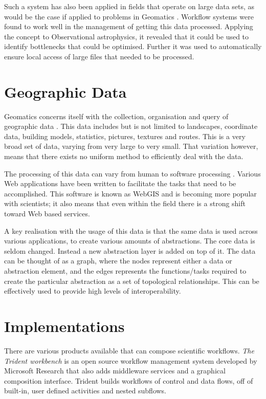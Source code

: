 \documentclass[12pt,a4paper]{report}
\begin{document}
Such a system has also been applied in fields that operate on large data
sets, as would be the case if applied to problems in Geomatics
\cite{Aragon:2009:WMH:1529282.1529491}.  Workflow systems were found to
work well in the management of getting this data processed. Applying the
concept to Observational astrophysics, it revealed that it could be used to
identify bottlenecks that could be optimised.  Further it was used to
automatically ensure local access of large files that needed to be processed.


\section{Geographic Data}
Geomatics concerns itself with the collection, organisation and query of
geographic data \cite{DiMartino:2007:TAG:1341012.1341081}.  This data includes
but  is not limited to landscapes, coordinate data, building models,
statistics, pictures, textures and routes. This is a very broad set of data,
varying from very large to very small.  That variation however, means that
there exists no uniform method to efficiently deal with the data.

The processing of this data can vary from human to software processing
\cite{DiMartino:2007:TAG:1341012.1341081}.  Various Web applications have been
written to facilitate the tasks that need to be accomplished.  This software is
known as WebGIS and is becoming more popular with scientists; it also means
that even within the field there is a strong shift toward Web based services.

A key realisation with the usage of this data is that the same data is used
across various applications, to create various amounts of
abstractions\cite{ElAdnani:2001:MLF:512161.512177}.  The core data is seldom
changed. Instead a new abstraction layer is added on top of it. The data can be
thought of as a graph, where the nodes represent either a data or abstraction
element, and the edges represents the functions/tasks required to create the
particular abstraction as a set of topological relationships. This can be
effectively used to provide high levels of interoperability.

\section{Implementations}
There are various products available that can compose scientific workflows.
\emph{The Trident workbench} \cite{Simmhan:2009:BTS:1673063.1673121} is an open
source workflow management system developed by Microsoft Research that also
adds middleware services and a graphical composition interface. Trident builds
workflows of control and data flows, off of built-in, user defined activities
and nested subflows.
\end{document}
